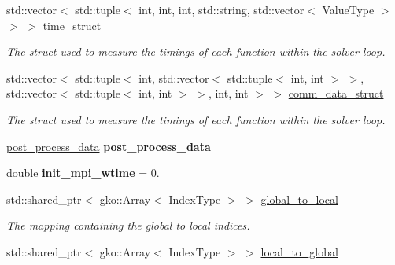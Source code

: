 \begin{DoxyCompactItemize}
std\+::vector$<$ std\+::tuple$<$ int, int, int, std\+::string, std\+::vector$<$ Value\+Type $>$ $>$ $>$ \hyperlink{structschwz_1_1Metadata_a50bb2b3dc28c0eabbd423a069e560951}{time\+\_\+struct}
\begin{DoxyCompactList}\small\item\em The struct used to measure the timings of each function within the solver loop. \end{DoxyCompactList}\item 
\mbox{\label{structschwz_1_1Metadata_a54f774e70eb42b84f63f702262b99fa6}} 
std\+::vector$<$ std\+::tuple$<$ int, std\+::vector$<$ std\+::tuple$<$ int, int $>$ $>$, std\+::vector$<$ std\+::tuple$<$ int, int $>$ $>$, int, int $>$ $>$ \hyperlink{structschwz_1_1Metadata_a54f774e70eb42b84f63f702262b99fa6}{comm\+\_\+data\+\_\+struct}
\begin{DoxyCompactList}\small\item\em The struct used to measure the timings of each function within the solver loop. \end{DoxyCompactList}\item 
\mbox{\label{structschwz_1_1Metadata_abb52c3cb813542a696cb1a9420503bd6}} 
\hyperlink{structschwz_1_1Metadata_1_1post__process__data}{post\+\_\+process\+\_\+data} {\bfseries post\+\_\+process\+\_\+data}
\item 
\mbox{\label{structschwz_1_1Metadata_afdcd2ea0372a8a49749e036095f23f40}} 
double {\bfseries init\+\_\+mpi\+\_\+wtime} = 0.
\item 
\mbox{\label{structschwz_1_1Metadata_a0ad24ef496c5e99cb0c5c2e8af3a1fab}} 
std\+::shared\+\_\+ptr$<$ gko\+::\+Array$<$ Index\+Type $>$ $>$ \hyperlink{structschwz_1_1Metadata_a0ad24ef496c5e99cb0c5c2e8af3a1fab}{global\+\_\+to\+\_\+local}
\begin{DoxyCompactList}\small\item\em The mapping containing the global to local indices. \end{DoxyCompactList}\item 
\mbox{\label{structschwz_1_1Metadata_acadbecaaeb439bc25e079a595fb084fa}} 
std\+::shared\+\_\+ptr$<$ gko\+::\+Array$<$ Index\+Type $>$ $>$ \hyperlink{structschwz_1_1Metadata_acadbecaaeb439bc25e079a595fb084fa}{local\+\_\+to\+\_\+global}

\end{DoxyCompactItemize}
